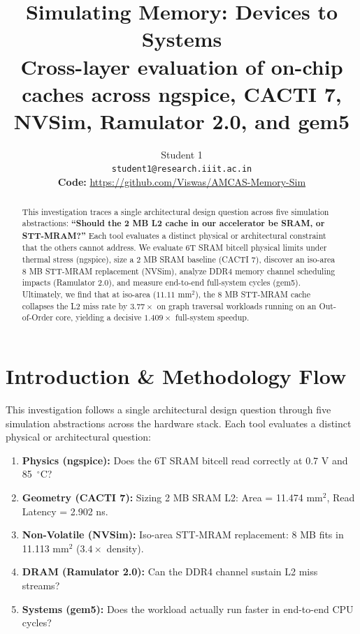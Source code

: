 \documentclass[10pt,a4paper,twocolumn]{article}
\title{\vspace{-1.0cm}\textbf{\Large Simulating Memory: Devices to Systems}\\
\large Cross-layer evaluation of on-chip caches across ngspice, CACTI 7, NVSim, Ramulator 2.0, and gem5}
\author{Student 1 \\
\small \texttt{student1@research.iiit.ac.in} \\
\small \textbf{Code:} \url{https://github.com/Viswas/AMCAS-Memory-Sim}}
\date{\vspace{-0.7cm}}
\begin{document}
\maketitle

\begin{abstract}
This investigation traces a single architectural design question across five simulation abstractions: \textbf{``Should the 2 MB L2 cache in our accelerator be SRAM, or STT-MRAM?''} Each tool evaluates a distinct physical or architectural constraint that the others cannot address. We evaluate 6T SRAM bitcell physical limits under thermal stress (ngspice), size a 2 MB SRAM baseline (CACTI 7), discover an iso-area 8 MB STT-MRAM replacement (NVSim), analyze DDR4 memory channel scheduling impacts (Ramulator 2.0), and measure end-to-end full-system cycles (gem5). Ultimately, we find that at iso-area ($11.11\text{ mm}^2$), the 8 MB STT-MRAM cache collapses the L2 miss rate by $3.77\times$ on graph traversal workloads running on an Out-of-Order core, yielding a decisive $1.409\times$ full-system speedup.
\end{abstract}

\section{Introduction \& Methodology Flow}

This investigation follows a single architectural design question through five simulation abstractions across the hardware stack. Each tool evaluates a distinct physical or architectural question:
\begin{enumerate}[leftmargin=*]
    \item \textbf{Physics (ngspice):} Does the 6T SRAM bitcell read correctly at 0.7 V and 85~$^\circ$C?
    \item \textbf{Geometry (CACTI 7):} Sizing 2 MB SRAM L2: Area = 11.474 mm$^2$, Read Latency = 2.902 ns.
    \item \textbf{Non-Volatile (NVSim):} Iso-area STT-MRAM replacement: 8 MB fits in 11.113 mm$^2$ ($3.4\times$ density).
    \item \textbf{DRAM (Ramulator 2.0):} Can the DDR4 channel sustain L2 miss streams?
    \item \textbf{Systems (gem5):} Does the workload actually run faster in end-to-end CPU cycles?
\end{enumerate}

\begin{figure}[h]
\centering
{}
\end{figure}
\end{document}
